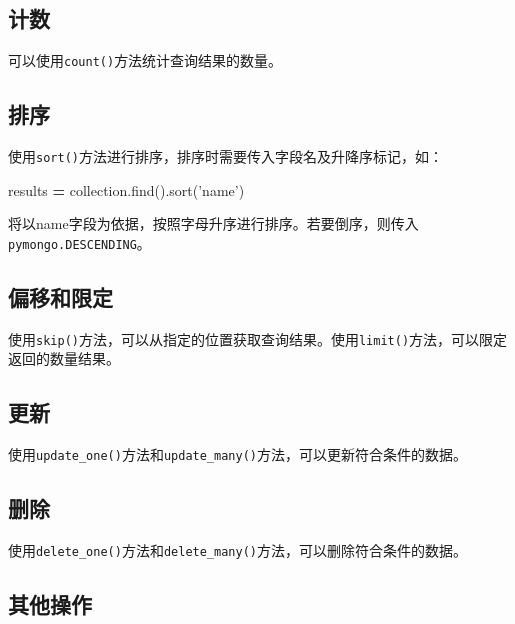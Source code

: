 \documentclass[]{ctexbook}
\newenvironment{Shaded}{\begin{snugshade}}{\end{snugshade}}
\newcommand{\NormalTok}[1]{#1}
\newcommand{\OperatorTok}[1]{\textcolor[rgb]{0.81,0.36,0.00}{\textbf{#1}}}
\newcommand{\StringTok}[1]{\textcolor[rgb]{0.31,0.60,0.02}{#1}}
\begin{document}
\hypertarget{ux8ba1ux6570-1}{%
\subsection{计数}\label{ux8ba1ux6570-1}}

可以使用\texttt{count()}方法统计查询结果的数量。

\hypertarget{ux6392ux5e8f}{%
\subsection{排序}\label{ux6392ux5e8f}}

使用\texttt{sort()}方法进行排序，排序时需要传入字段名及升降序标记，如：

\begin{Shaded}
\begin{Highlighting}[]
\NormalTok{results }\OperatorTok{=}\NormalTok{ collection.find().sort(}\StringTok{'name'}\NormalTok{)}
\end{Highlighting}
\end{Shaded}

将以name字段为依据，按照字母升序进行排序。若要倒序，则传入\texttt{pymongo.DESCENDING}。

\hypertarget{ux504fux79fbux548cux9650ux5b9a}{%
\subsection{偏移和限定}\label{ux504fux79fbux548cux9650ux5b9a}}

使用\texttt{skip()}方法，可以从指定的位置获取查询结果。使用\texttt{limit()}方法，可以限定返回的数量结果。

\hypertarget{ux66f4ux65b0}{%
\subsection{更新}\label{ux66f4ux65b0}}

使用\texttt{update\_one()}方法和\texttt{update\_many()}方法，可以更新符合条件的数据。

\hypertarget{ux5220ux9664}{%
\subsection{删除}\label{ux5220ux9664}}

使用\texttt{delete\_one()}方法和\texttt{delete\_many()}方法，可以删除符合条件的数据。

\hypertarget{ux5176ux4ed6ux64cdux4f5c}{%
\subsection{其他操作}\label{ux5176ux4ed6ux64cdux4f5c}}
\end{document}
